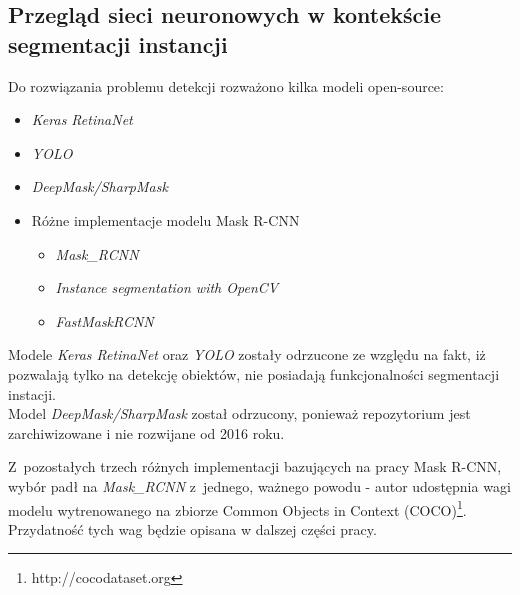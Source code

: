 \subsection{Przegląd sieci neuronowych w kontekście segmentacji instancji}

Do rozwiązania problemu detekcji rozważono kilka modeli open-source:

\begin{itemize}
	\item \textit{Keras RetinaNet} \cite{keras-retinanet}
	\item \textit{YOLO} \cite{yolo}
	\item \textit{DeepMask/SharpMask} \cite{deep-sharp-mask}
	\item Różne implementacje modelu Mask R-CNN \cite{general-mask-rcnn}
		\begin{itemize}
			\item \textit{Mask\_RCNN} \cite{matterport-mask-rcnn}
			\item \textit{Instance segmentation with OpenCV} \cite{mask-rcnn-opencv}
			\item \textit{FastMaskRCNN} \cite{fast-mask-rcnn}
		\end{itemize}
\end{itemize}

Modele \textit{Keras RetinaNet} oraz \textit{YOLO} zostały odrzucone ze względu na fakt, iż pozwalają tylko na detekcję obiektów, nie posiadają funkcjonalności segmentacji instacji. \\

Model \textit{DeepMask/SharpMask} został odrzucony, ponieważ repozytorium jest zarchiwizowane i nie rozwijane od 2016 roku.

Z~pozostałych trzech różnych implementacji bazujących na pracy Mask R-CNN, wybór padł na \textit{Mask\_RCNN} z~jednego, ważnego powodu - autor udostępnia wagi modelu wytrenowanego na zbiorze Common Objects in Context (COCO)\footnote{http://cocodataset.org}. Przydatność tych wag będzie opisana w dalszej części pracy.
